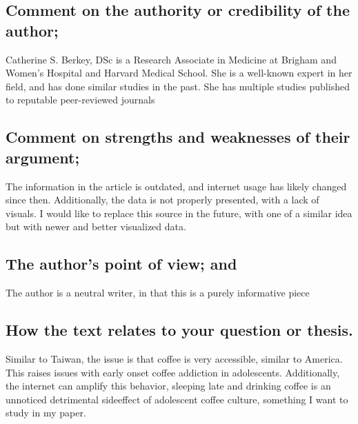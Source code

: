 \documentclass{scrartcl}
\begin{document}
\subsection{Comment on the authority or credibility of the author;}
\label{sec:org4d445bd}
Catherine S. Berkey, DSc is a Research Associate in Medicine at Brigham and Women's Hospital and Harvard Medical School. She is a well-known expert in her field, and has done similar studies in the past. She has multiple studies published to reputable peer-reviewed journals
\subsection{Comment on strengths and weaknesses of their argument;}
\label{sec:org880dc0d}
The information in the article is outdated, and internet usage has likely changed since then. Additionally, the data is not properly presented, with a lack of visuals. I would like to replace this source in the future, with one of a similar idea but with newer and better visualized data.
\subsection{The author’s point of view; and}
\label{sec:orga2c28c2}
The author is a neutral writer, in that this is a purely informative piece
\subsection{How the text relates to your question or thesis.}
\label{sec:org3094f7b}
Similar to Taiwan, the issue is that coffee is very accessible, similar to America. This raises issues with early onset coffee addiction in adolescents. Additionally, the internet can amplify this behavior, sleeping late and drinking coffee is an unnoticed detrimental sideeffect of adolescent coffee culture, something I want to study in my paper.
\end{document}
